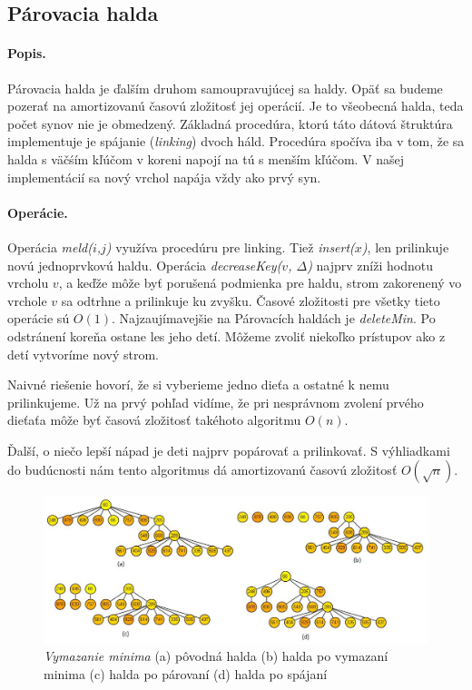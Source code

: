 \subsection{Párovacia halda} 
\paragraph{Popis.}
Párovacia halda je ďalším druhom samoupravujúcej sa haldy. Opäť sa budeme pozerať na amortizovanú časovú zložitosť jej operácií.
Je to všeobecná halda, teda počet synov nie je obmedzený.
Základná procedúra, ktorú táto dátová štruktúra implementuje je spájanie (\emph{linking}) dvoch háld. Procedúra spočíva iba v tom, že sa halda s väčśím kľúčom v koreni napojí na tú s menším kľúčom. V našej implementácií sa nový vrchol napája vždy ako prvý syn.

\paragraph{Operácie.}
Operácia \emph{meld($i$,$j$)} využíva procedúru pre linking. Tiež \emph{insert($x$)}, len prilinkuje novú jednoprvkovú haldu. Operácia \emph{decreaseKey($v$, $\Delta$)} najprv zníži hodnotu vrcholu $v$, a keďže môže byť porušená podmienka pre haldu, strom zakorenený vo vrchole $v$ sa odtrhne a prilinkuje ku zvyšku. Časové zložitosti pre všetky tieto operácie sú $O(1)$.
Najzaujímavejšie na Párovacích haldách je \emph{deleteMin}. Po odstránení koreňa ostane les jeho detí. Môžeme zvoliť niekoľko prístupov ako z detí vytvoríme nový strom.

Naivné riešenie hovorí, že si vyberieme jedno dieťa a ostatné k nemu prilinkujeme. Už na prvý pohľad vidíme, že pri nesprávnom 
zvolení prvého dieťaťa môže byť časová zložitosť takéhoto algoritmu $O(n)$.

Ďalší, o niečo lepší nápad je deti najprv popárovať a prilinkovať. S výhliadkami do budúcnosti nám tento algoritmus dá 
amortizovanú časovú zložitosť $O(\sqrt{n})$.

\begin{figure}
\includegraphics[width=\columnwidth]{obrazky/pairdel.png}
\caption{\emph{Vymazanie minima} 
(a) pôvodná halda (b) halda po vymazaní minima (c) halda po párovaní (d) halda po spájaní} 
\label{img:pairdel} 
\end{figure}

